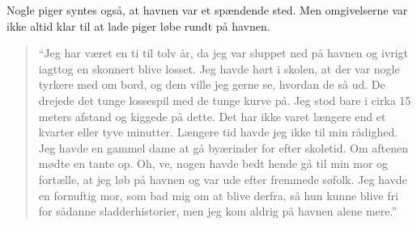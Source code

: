 Nogle piger syntes også, at havnen var et spændende sted. Men
omgivelserne var ikke altid klar til at lade piger løbe rundt på havnen.

\begin{quote}
``Jeg har været en ti til tolv år, da jeg var sluppet ned på havnen og
ivrigt iagttog en skonnert blive losset. Jeg havde hørt i skolen, at der
var nogle tyrkere med om bord, og dem ville jeg gerne se, hvordan de så
ud. De drejede det tunge lossespil med de tunge kurve på. Jeg stod bare
i cirka 15 meters afstand og kiggede på dette. Det har ikke varet
længere end et kvarter eller tyve minutter. Længere tid havde jeg ikke
til min rådighed. Jeg havde en gammel dame at gå byærinder for efter
skoletid. Om aftenen mødte en tante op. Oh, ve, nogen havde bedt hende
gå til min mor og fortælle, at jeg løb på havnen og var ude efter
fremmede søfolk. Jeg havde en fornuftig mor, som bad mig om at blive
derfra, så hun kunne blive fri for sådanne sladderhistorier, men jeg kom
aldrig på havnen alene mere.''
\end{quote}

